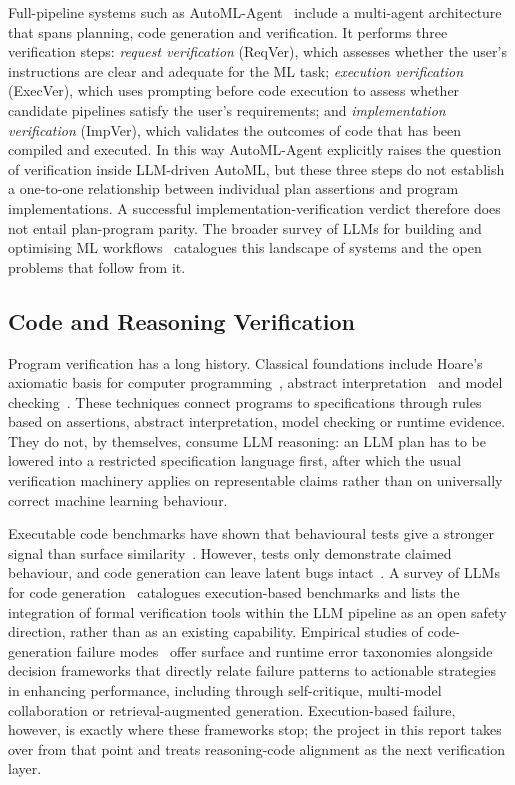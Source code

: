 Full-pipeline systems such as AutoML-Agent~\cite{automlagent}
include a multi-agent architecture that spans planning, code
generation and verification. It performs three verification steps:
\emph{request verification} (ReqVer), which assesses whether the
user's instructions are clear and adequate for the ML task;
\emph{execution verification} (ExecVer), which uses prompting before
code execution to assess whether candidate pipelines
satisfy the user's requirements; and \emph{implementation
verification} (ImpVer), which validates the outcomes of code that has
been compiled and executed. In this way AutoML-Agent explicitly
raises the question of verification inside LLM-driven AutoML, but
these three steps do not establish a one-to-one relationship
between individual plan assertions and program implementations. A
successful implementation-verification verdict therefore does not
entail plan-program parity. The broader survey of LLMs for building
and optimising ML workflows~\cite{llmauto} catalogues this landscape
of systems and the open problems that follow from it.

\subsection{Code and Reasoning Verification}

Program verification has a long history. Classical foundations
include Hoare's axiomatic basis for computer
programming~\cite{hoare1969}, abstract interpretation~\cite{cousot1977}
and model checking~\cite{clarke1999}. These techniques connect
programs to specifications through rules based on assertions,
abstract interpretation, model checking or runtime evidence. They
do not, by themselves, consume LLM reasoning: an LLM plan has to be
lowered into a restricted specification language first, after which
the usual verification machinery applies on representable claims
rather than on universally correct machine learning behaviour.

Executable code benchmarks have shown that behavioural tests give a
stronger signal than surface similarity~\cite{humaneval,
programsynthesis}. However, tests only demonstrate claimed behaviour,
and code generation can leave latent bugs intact~\cite{copilot}. A
survey of LLMs for code generation~\cite{jiang2026survey} catalogues
execution-based benchmarks and lists the integration of formal
verification tools within the LLM pipeline as an open safety
direction, rather than as an existing capability. Empirical studies of
code-generation failure modes~\cite{shen2026failure} offer surface
and runtime error taxonomies alongside decision frameworks that
directly relate failure patterns to actionable strategies in enhancing
performance, including through self-critique, multi-model
collaboration or retrieval-augmented generation. Execution-based
failure, however, is exactly where these frameworks stop; the project
in this report takes over from that point and treats reasoning-code
alignment as the next verification layer.

